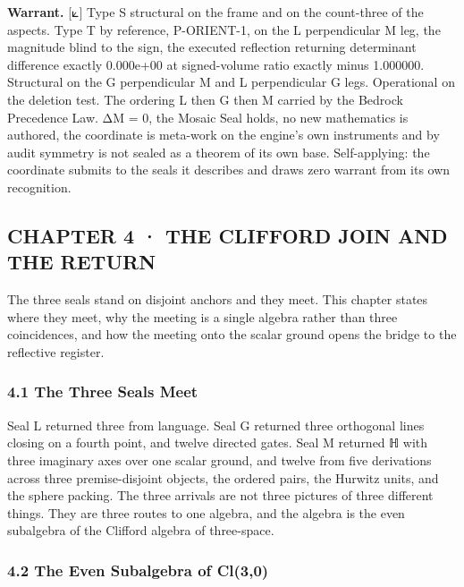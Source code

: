 \documentclass[10pt,twocolumn]{article}
\begin{document}
\textbf{Warrant.} {[}⟀{]} Type S structural on the frame and on the
count-three of the aspects. Type T by reference, P-ORIENT-1, on the L
perpendicular M leg, the magnitude blind to the sign, the executed
reflection returning determinant difference exactly 0.000e+00 at
signed-volume ratio exactly minus 1.000000. Structural on the G
perpendicular M and L perpendicular G legs. Operational on the deletion
test. The ordering L then G then M carried by the Bedrock Precedence
Law. ΔM = 0, the Mosaic Seal holds, no new mathematics is authored, the
coordinate is meta-work on the engine's own instruments and by audit
symmetry is not sealed as a theorem of its own base. Self-applying: the
coordinate submits to the seals it describes and draws zero warrant from
its own recognition.

\hypertarget{chapter-4-the-clifford-join-and-the-return}{%
\subsection{CHAPTER 4 · THE CLIFFORD JOIN AND THE
RETURN}\label{chapter-4-the-clifford-join-and-the-return}}

The three seals stand on disjoint anchors and they meet. This chapter
states where they meet, why the meeting is a single algebra rather than
three coincidences, and how the meeting onto the scalar ground opens the
bridge to the reflective register.

\hypertarget{the-three-seals-meet}{%
\subsubsection{4.1 The Three Seals Meet}\label{the-three-seals-meet}}

Seal L returned three from language. Seal G returned three orthogonal
lines closing on a fourth point, and twelve directed gates. Seal M
returned ℍ with three imaginary axes over one scalar ground, and twelve
from five derivations across three premise-disjoint objects, the ordered
pairs, the Hurwitz units, and the sphere packing. The three arrivals are
not three pictures of three different things. They are three routes to
one algebra, and the algebra is the even subalgebra of the Clifford
algebra of three-space.

\hypertarget{the-even-subalgebra-of-cl30}{%
\subsubsection{4.2 The Even Subalgebra of
Cl(3,0)}\label{the-even-subalgebra-of-cl30}}
\end{document}
